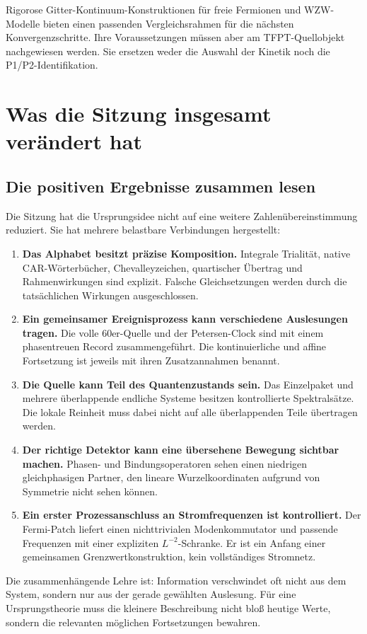 \documentclass[11pt,a4paper,oneside,parskip=half,headings=normal,numbers=noenddot,bibliography=totoc]{scrreprt}
\begin{document}
Rigorose Gitter-Kontinuum-Konstruktionen für freie Fermionen und WZW-Modelle bieten einen passenden Vergleichsrahmen für die nächsten Konvergenzschritte. Ihre Voraussetzungen müssen aber am TFPT-Quellobjekt nachgewiesen werden. Sie ersetzen weder die Auswahl der Kinetik noch die P1/P2-Identifikation. \cite{osborne}

\chapter{Was die Sitzung insgesamt verändert hat}
\section{Die positiven Ergebnisse zusammen lesen}
Die Sitzung hat die Ursprungsidee nicht auf eine weitere Zahlenübereinstimmung reduziert. Sie hat mehrere belastbare Verbindungen hergestellt:
\begin{enumerate}
\item \textbf{Das Alphabet besitzt präzise Komposition.} Integrale Trialität, native CAR-Wörterbücher, Chevalleyzeichen, quartischer Übertrag und Rahmenwirkungen sind explizit. Falsche Gleichsetzungen werden durch die tatsächlichen Wirkungen ausgeschlossen.
\item \textbf{Ein gemeinsamer Ereignisprozess kann verschiedene Auslesungen tragen.} Die volle 60er-Quelle und der Petersen-Clock sind mit einem phasentreuen Record zusammengeführt. Die kontinuierliche und affine Fortsetzung ist jeweils mit ihren Zusatzannahmen benannt.
\item \textbf{Die Quelle kann Teil des Quantenzustands sein.} Das Einzelpaket und mehrere überlappende endliche Systeme besitzen kontrollierte Spektralsätze. Die lokale Reinheit muss dabei nicht auf alle überlappenden Teile übertragen werden.
\item \textbf{Der richtige Detektor kann eine übersehene Bewegung sichtbar machen.} Phasen- und Bindungsoperatoren sehen einen niedrigen gleichphasigen Partner, den lineare Wurzelkoordinaten aufgrund von Symmetrie nicht sehen können.
\item \textbf{Ein erster Prozessanschluss an Stromfrequenzen ist kontrolliert.} Der Fermi-Patch liefert einen nichttrivialen Modenkommutator und passende Frequenzen mit einer expliziten $L^{-2}$-Schranke. Er ist ein Anfang einer gemeinsamen Grenzwertkonstruktion, kein vollständiges Stromnetz.
\end{enumerate}

Die zusammenhängende Lehre ist: Information verschwindet oft nicht aus dem System, sondern nur aus der gerade gewählten Auslesung. Für eine Ursprungstheorie muss die kleinere Beschreibung nicht bloß heutige Werte, sondern die relevanten möglichen Fortsetzungen bewahren.
\end{document}
